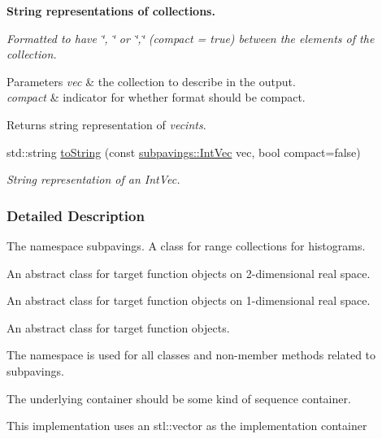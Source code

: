\begin{Indent}{\bf \-String representations of collections.}\par
{\em \-Formatted to have \char`\"{}, \char`\"{} or \char`\"{},\char`\"{} ({\itshape compact\/} = true) between the elements of the collection.


\begin{DoxyParams}{\-Parameters}
{\em vec} & the collection to describe in the output. \\
\hline
{\em compact} & indicator for whether format should be compact. \\
\hline
\end{DoxyParams}
\begin{DoxyReturn}{\-Returns}
string representation of {\itshape vecints\/}. 
\end{DoxyReturn}
}\begin{DoxyCompactItemize}
\item 
std\-::string \hyperlink{namespacesubpavings_a1c85cfc0ad8721fc6b480d66d51a653d}{to\-String} (const \hyperlink{namespacesubpavings_aed8e75b2af342b9c1460431c223dca8e}{subpavings\-::\-Int\-Vec} vec, bool compact=false)
\begin{DoxyCompactList}\small\item\em \-String representation of an \-Int\-Vec. \end{DoxyCompactList}\end{DoxyCompactItemize}
\end{Indent}


\subsubsection{\-Detailed \-Description}
\-The namespace subpavings. \-A class for range collections for histograms.

\-An abstract class for target function objects on 2-\/dimensional real space.

\-An abstract class for target function objects on 1-\/dimensional real space.

\-An abstract class for target function objects.

\-The namespace is used for all classes and non-\/member methods related to subpavings.

\-The underlying container should be some kind of sequence container.

\-This implementation uses an stl\-::vector as the implementation container 

